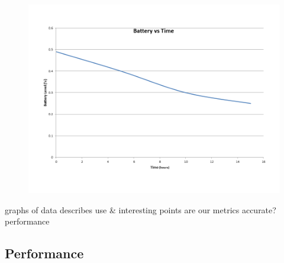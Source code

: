 \begin{figure}[ht!]
	\begin{center}
		\includegraphics[width=\columnwidth]{figs/bat_vs_time_short.png}
		\caption{}
		\label{fig:bat_vs_time_short}
\end{center}
\end{figure}

graphs of data
describes use \& interesting points
%
are our metrics accurate?
%
performance

\subsection{Performance}
